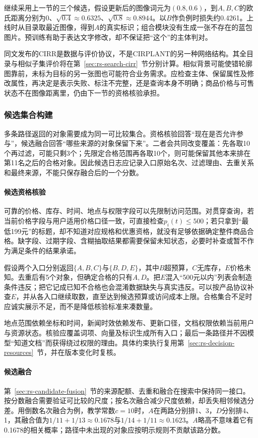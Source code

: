 继续采用上一节的三个候选，假设更新后的图像词元为$(0.8,0.6)$，到$A,B,C$的欧氏距离分别为0、$\sqrt{0.4}\approx0.6325$、$\sqrt{0.8}\approx0.8944$。以$B$作负例时损失约0.4261。上线时从目录取最近图像，得到$A$的真实标识；组合模块没有生成一张不存在的蓝包图片。预训练有助于表达文字修改，却不保证把“这个”的主体判对。

同文发布的CIRR是数据与评价协议，不是CIRPLANT的另一种网络结构。其全目录与相似子集评价将在第~\ref{sec:rs-search-cirr}~节分别计算。相似背景可能使错轮廓图靠前，未标为目标的另一张图也可能符合业务需求。应检查主体、保留属性及修改属性，再决定是表示失败、标注不完整，还是查询本身不明确；商品价格与可售状态不在图像距离里，仍由下一节的资格核验承担。

\subsubsection{候选集合构建}
\label{sec:rs-search-candidate-set}

多条路径返回的对象需要成为同一可比较集合。资格核验回答“现在是否允许参与”，候选融合回答“哪些来源的对象保留下来”。二者会共同改变覆盖：先各取10个再过滤，可能只剩3个；先限定合格范围再各取10个，则可能保留其他本来排在第11名之后的合格对象。因此候选日志应记录入口原始名次、过滤理由、去重关系和最终来源，不能只保存融合后的一个分数。

\paragraph*{候选资格核验}
可靠的价格、库存、时间、地点与权限字段可以先限制访问范围。对贯穿查询，若当前价格字段与用户适用价格口径一致，可直接检查$p_i(t)\leq500$；若只拿到“最低199元”的标题，却不知道对应规格和优惠资格，就没有足够依据确定整件商品合格。缺字段、过期字段、含糊抽取结果都需要保留未知状态，必要时补查或暂不作为满足条件的结果承诺。

假设两个入口分别返回$\{A,B,C\}$与$\{B,D,E\}$，其中$B$超预算，$C$无库存，$E$价格未知。去重后有5个对象，但确定合格的只有$A,D$。把$E$混入“500元以内”列表会制造条件违反；把它记成已知不合格也会混淆数据缺失与真实违反。可以按产品协议补查$E$，并从各入口继续取数，直至达到候选预算或访问成本上限。合格集合不足时应诚实展示不足，而不是降低核验标准来凑数量。

地点范围依赖坐标和时间，新闻时效依赖发布、更新口径，文档权限依赖当前用户与资源状态。核验应覆盖词项、向量及标识生成所有入口；最后一条路径并不因模型“知道文档”而获得绕过权限的理由。具体约束执行复用第~\ref{sec:rs-decision-resources}~节，并在版本变化时复核。

\paragraph*{候选融合}
第~\ref{sec:rs-candidate-fusion}~节的来源配额、去重和融合在搜索中保持同一接口。按分数融合需要验证可比较的尺度；按名次融合减少尺度依赖，却丢失相邻候选分差。用倒数名次融合为例，教学常数$c=10$时，$A$在两路分别排1、3，$D$分别排4、1，其融合值为$1/11+1/13\approx0.1678$与$1/14+1/11\approx0.1623$。$A$略高不意味着它有0.1678的相关概率；路径中未出现的对象应按明示规则不贡献该路分数。


